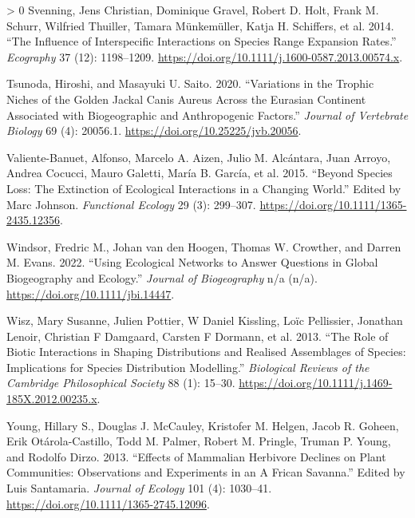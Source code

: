 \documentclass[10pt,oneside]{article}
\newlength{\cslhangindent}
\newenvironment{CSLReferences}[3] %
 {%
  \setlength{\parindent}{0pt}
  \ifodd #1 \everypar{\setlength{\hangindent}{\cslhangindent}}\ignorespaces\fi
  \ifnum #2 > 0
  \setlength{\parskip}{#2\baselineskip}
  \fi
 }%
 {}
\begin{document}
\begin{CSLReferences}{1}{0}
\leavevmode\hypertarget{ref-Svenning2014InfInt}{}%
Svenning, Jens Christian, Dominique Gravel, Robert D. Holt, Frank M.
Schurr, Wilfried Thuiller, Tamara Münkemüller, Katja H. Schiffers, et
al. 2014. {``The Influence of Interspecific Interactions on Species
Range Expansion Rates.''} \emph{Ecography} 37 (12): 1198--1209.
\url{https://doi.org/10.1111/j.1600-0587.2013.00574.x}.

\leavevmode\hypertarget{ref-Tsunoda2020VarTro}{}%
Tsunoda, Hiroshi, and Masayuki U. Saito. 2020. {``Variations in the
Trophic Niches of the Golden Jackal Canis Aureus Across the Eurasian
Continent Associated with Biogeographic and Anthropogenic Factors.''}
\emph{Journal of Vertebrate Biology} 69 (4): 20056.1.
\url{https://doi.org/10.25225/jvb.20056}.

\leavevmode\hypertarget{ref-Valiente-Banuet2015SpeLos}{}%
Valiente-Banuet, Alfonso, Marcelo A. Aizen, Julio M. Alcántara, Juan
Arroyo, Andrea Cocucci, Mauro Galetti, María B. García, et al. 2015.
{``Beyond Species Loss: The Extinction of Ecological Interactions in a
Changing World.''} Edited by Marc Johnson. \emph{Functional Ecology} 29
(3): 299--307. \url{https://doi.org/10.1111/1365-2435.12356}.

\leavevmode\hypertarget{ref-Windsor2022UsiEco}{}%
Windsor, Fredric M., Johan van den Hoogen, Thomas W. Crowther, and
Darren M. Evans. 2022. {``Using Ecological Networks to Answer Questions
in Global Biogeography and Ecology.''} \emph{Journal of Biogeography}
n/a (n/a). \url{https://doi.org/10.1111/jbi.14447}.

\leavevmode\hypertarget{ref-Wisz2013RolBio}{}%
Wisz, Mary Susanne, Julien Pottier, W Daniel Kissling, Loïc Pellissier,
Jonathan Lenoir, Christian F Damgaard, Carsten F Dormann, et al. 2013.
{``The Role of Biotic Interactions in Shaping Distributions and Realised
Assemblages of Species: Implications for Species Distribution
Modelling.''} \emph{Biological Reviews of the Cambridge Philosophical
Society} 88 (1): 15--30.
\url{https://doi.org/10.1111/j.1469-185X.2012.00235.x}.

\leavevmode\hypertarget{ref-Young2013EffMam}{}%
Young, Hillary S., Douglas J. McCauley, Kristofer M. Helgen, Jacob R.
Goheen, Erik Otárola-Castillo, Todd M. Palmer, Robert M. Pringle, Truman
P. Young, and Rodolfo Dirzo. 2013. {``Effects of Mammalian Herbivore
Declines on Plant Communities: Observations and Experiments in an
\textsc{A} Frican Savanna.''} Edited by Luis Santamaria. \emph{Journal
of Ecology} 101 (4): 1030--41.
\url{https://doi.org/10.1111/1365-2745.12096}.

\end{CSLReferences}
\end{document}
